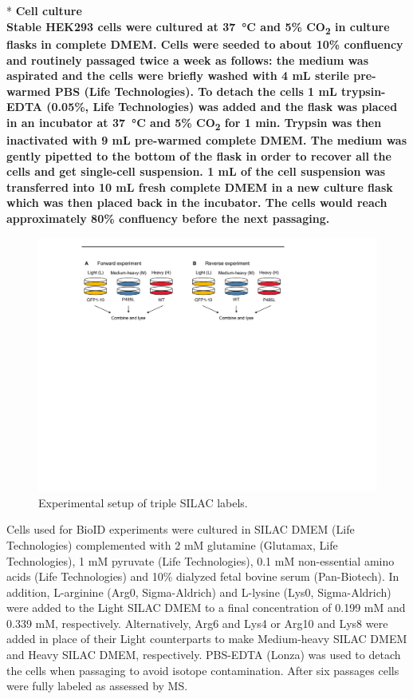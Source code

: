 \\
\\*
\bfseries{Cell culture}\\
\normalfont Stable HEK293 cells were cultured at \SI{37}{\celsius} and 5\% CO\textsubscript{2} in culture flasks in complete DMEM. Cells were seeded to about 10\% confluency and routinely passaged twice a week as follows: the medium was aspirated and the cells were briefly washed with 4 mL sterile pre-warmed PBS (Life Technologies). To detach the cells 1 mL trypsin-EDTA (0.05\%, Life Technologies) was added and the flask was placed in an incubator at \SI{37}{\celsius} and 5\% CO\textsubscript{2} for 1 min. Trypsin was then inactivated with 9 mL pre-warmed complete DMEM. The medium was gently pipetted to the bottom of the flask in order to recover all the cells and get single-cell suspension. 1 mL of the cell suspension was transferred into 10 mL fresh complete DMEM in a new culture flask which was then placed back in the incubator. The cells would reach approximately 80\% confluency before the next passaging.

\begin{figure}[h]
\centering
\includegraphics[scale=0.7]{Figures/BioID}
\caption{Experimental setup of triple SILAC labels.}
\label{fig:bioid}
\end{figure}
Cells used for BioID experiments were cultured in SILAC DMEM (Life Technologies) complemented with 2 mM glutamine (Glutamax, Life Technologies), 1 mM pyruvate (Life Technologies), 0.1 mM non-essential amino acids (Life Technologies) and 10\% dialyzed fetal bovine serum (Pan-Biotech). In addition, L-arginine (Arg0, Sigma-Aldrich) and L-lysine (Lys0, Sigma-Aldrich) were added to the Light SILAC DMEM to a final concentration of 0.199 mM and 0.339 mM, respectively. Alternatively, Arg6 and Lys4 or Arg10 and Lys8 were added in place of their Light counterparts to make Medium-heavy SILAC DMEM and Heavy SILAC DMEM, respectively. PBS-EDTA (Lonza) was used to detach the cells when passaging to avoid isotope contamination. After six passages cells were fully labeled as assessed by MS.

